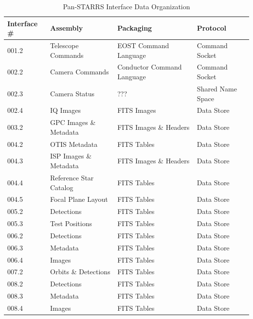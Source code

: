\documentclass[panstarrs,spec]{panstarrs}
\begin{document}
\begin{table}
  \begin{center}
    \caption{Pan-STARRS Interface Data Organization}
    \label{tab:overview}
    \begin{tabular}{|l|l|l|l|}
      \hline
      {\bf Interface \#} & {\bf Assembly} & {\bf Packaging} & {\bf Protocol} \\ \hline
      001.2 & Telescope Commands     & EOST Command Language      & Command Socket \\
      002.2 & Camera Commands        & Conductor Command Language & Command Socket \\
      002.3 & Camera Status          & ???                        & Shared Name Space \\
      002.4 & IQ Images              & FITS Images                & Data Store \\
      003.2 & GPC Images \& Metadata & FITS Images \& Headers     & Data Store \\
      \hline
      004.2 & OTIS Metadata          & FITS Tables                & Data Store \\
      004.3 & ISP Images \& Metadata & FITS Images \& Headers     & Data Store \\
      004.4 & Reference Star Catalog & FITS Tables                & Data Store \\
      004.5 & Focal Plane Layout     & FITS Tables                & Data Store \\
      \hline
      005.2 & Detections             & FITS Tables                & Data Store \\
      005.3 & Test Positions         & FITS Tables                & Data Store \\
      006.2 & Detections             & FITS Tables                & Data Store \\
      006.3 & Metadata               & FITS Tables                & Data Store \\
      006.4 & Images                 & FITS Tables                & Data Store \\
      007.2 & Orbits \& Detections   & FITS Tables                & Data Store \\
      008.2 & Detections             & FITS Tables                & Data Store \\
      008.3 & Metadata               & FITS Tables                & Data Store \\
      008.4 & Images                 & FITS Tables                & Data Store \\
      \hline
    \end{tabular}
  \end{center}
\end{table}
\end{document}
